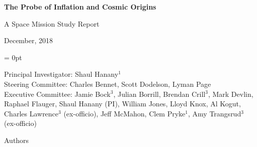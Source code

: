 \documentclass[PICOReport.tex]{subfiles}
\begin{document}

\LARGE{ \centerline{\bf{The Probe of Inflation and Cosmic Origins}}}
\vspace{0.4in}
\Large{ \centerline{A Space Mission Study Report}}
\Large{ \centerline{December, 2018 }}
\vspace{0.4in}
\parindent = 0pt
\normalsize{Principal Investigator: Shaul Hanany$^1$ \\
\normalsize{Steering Committee: Charles Bennet, Scott Dodelson, Lyman Page } \\
\normalsize{Executive Committee:  Jamie Bock$^3$, Julian Borrill, Brendan Crill$^3$, Mark Devlin, Raphael Flauger, Shaul Hanany (PI), William Jones, Lloyd Knox, Al Kogut, Charles Lawrence$^3$ (ex-officio), Jeff McMahon, Clem Pryke$^1$, Amy Trangsrud$^3$ (ex-officio)} \\

\label{authorlist}

\Large  {\centerline {Authors}}

\footnotesize {

}}
\end{document}
